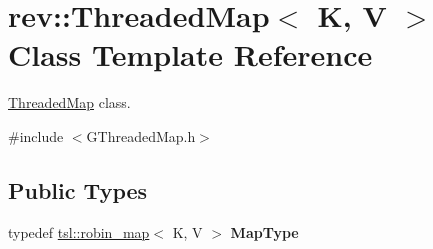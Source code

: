 \hypertarget{classrev_1_1_threaded_map}{}\section{rev\+::Threaded\+Map$<$ K, V $>$ Class Template Reference}
\label{classrev_1_1_threaded_map}


\mbox{\hyperlink{classrev_1_1_threaded_map}{Threaded\+Map}} class.  




{\ttfamily \#include $<$G\+Threaded\+Map.\+h$>$}

\subsection*{Public Types}
\begin{DoxyCompactItemize}
\item 
\mbox{\label{classrev_1_1_threaded_map_ab12ed406c12ac8f529b825ddbc09bfe0}} 
typedef \mbox{\hyperlink{classtsl_1_1robin__map}{tsl\+::robin\+\_\+map}}$<$ K, V $>$ {\bfseries Map\+Type}
\end{DoxyCompactItemize}
